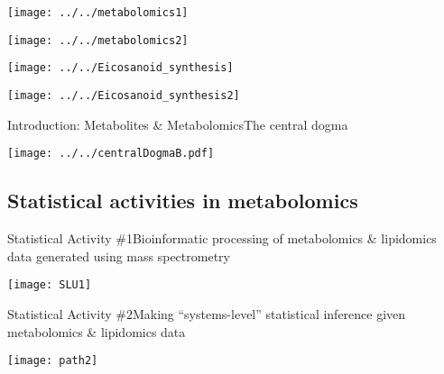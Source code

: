 \documentclass[xcolor=dvipsnames]{beamer}
\begin{document}
\begin{frame}
\begin{center}
	\texttt{[image: ../../metabolomics1]}
\end{center}
\addtocounter{framenumber}{-1}
\end{frame}

\begin{frame}
\begin{center}
	\texttt{[image: ../../metabolomics2]}
\end{center}
\addtocounter{framenumber}{-1}
\end{frame}

\begin{frame}
	\begin{center}
		\texttt{[image: ../../Eicosanoid\_synthesis]}
		
	\end{center}
\end{frame}

\begin{frame}
\begin{center}
	\texttt{[image: ../../Eicosanoid\_synthesis2]}
\end{center}
\addtocounter{framenumber}{-1}
\end{frame}

\begin{frame}{Introduction: Metabolites \& Metabolomics}{The central dogma}
\vspace{-7 pt}
\begin{center}
	\texttt{[image: ../../centralDogmaB.pdf]}
\end{center}
\end{frame}

\subsection{Statistical activities in metabolomics}
\begin{frame}{Statistical Activity \#1}{Bioinformatic processing of metabolomics \& lipidomics data generated using mass spectrometry}
\vspace{-15pt}
\begin{center}
	\texttt{[image: SLU1]}
\end{center}
\end{frame}

\begin{frame}{Statistical Activity \#2}{Making ``systems-level'' statistical inference given metabolomics \& lipidomics data}
\vspace{-15pt}
\begin{center}
\texttt{[image: path2]}
\end{center}
\end{frame}
\end{document}

